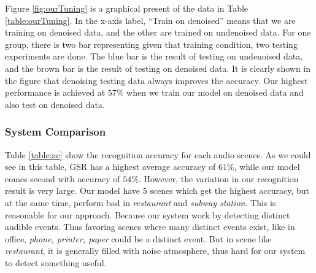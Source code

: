Figure \ref{fig:ourTuning} is a graphical present of the data in Table \ref{table:ourTuning}. 
In the x-axis label, ``Train on denoised'' means that we are training on denoised data, and the other are trained on undenoised data. 
For one group, there is two bar representing given that training condition, two testing experiments are done. 
The blue bar is the result of testing on undenoised data, and the brown bar is the result of testing on denoised data. 
It is clearly shown in the figure that denoising testing data always improves the accuracy. 
Our highest performance is achieved at $57\%$ when we train our model on denoised data and also test on denoised data. 

\subsubsection{System Comparison}
Table \ref{table:ac} show the recognition accuracy for each audio scenes. 
As we could see in this table, GSR has a highest average accuracy of $61\%$, while our model comes second with accuracy of $54\%$. 
However, the variation in our recognition result is very large. 
Our model have 5 scenes which get the highest accuracy, but at the same time, perform bad in \textit{restaurant} and \textit{subway station}. 
This is reasonable for our approach. 
Because our system work by detecting distinct audible events. 
Thus favoring scenes where many distinct events exist, like in office, \textit{phone, printer, paper} could be a distinct event. 
But in scene like \textit{restaurant}, it is generally filled with noise atmosphere, thus hard for our system to detect something useful. 

\begin{table}[htb!]
\centering
{}
\caption{Recognition accuracy for 10 audio scenes}
\label{table:ac}
\end{table}

